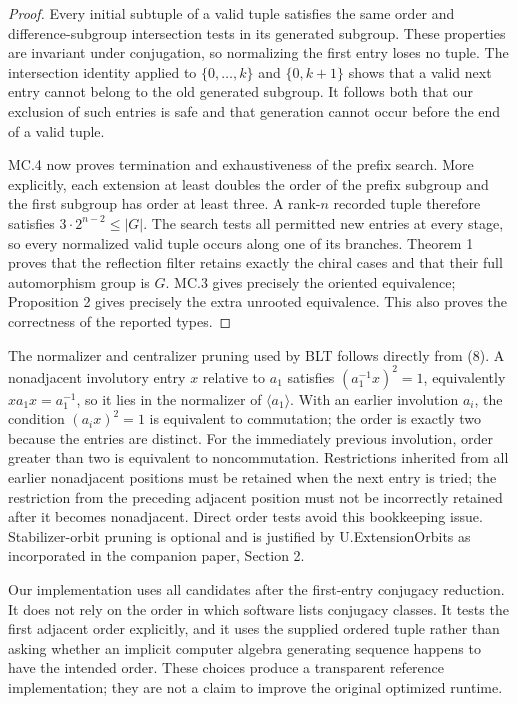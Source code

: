 \documentclass[11pt]{article}
\theoremstyle{remark}\newtheorem{remark}[theorem]{Remark}
\begin{document}
\begin{proof}
Every initial subtuple of a valid tuple satisfies the same order and difference-subgroup intersection tests in its generated subgroup. These properties are invariant under conjugation, so normalizing the first entry loses no tuple. The intersection identity applied to $\{0,\ldots,k\}$ and $\{0,k+1\}$ shows that a valid next entry cannot belong to the old generated subgroup. It follows both that our exclusion of such entries is safe and that generation cannot occur before the end of a valid tuple.

MC.4 now proves termination and exhaustiveness of the prefix search. More explicitly, each extension at least doubles the order of the prefix subgroup and the first subgroup has order at least three. A rank-$n$ recorded tuple therefore satisfies $3\cdot2^{n-2}\leq |G|$. The search tests all permitted new entries at every stage, so every normalized valid tuple occurs along one of its branches. Theorem 1 proves that the reflection filter retains exactly the chiral cases and that their full automorphism group is $G$. MC.3 gives precisely the oriented equivalence; Proposition 2 gives precisely the extra unrooted equivalence. This also proves the correctness of the reported types.
\end{proof}

The normalizer and centralizer pruning used by BLT follows directly from (8). A nonadjacent involutory entry $x$ relative to $a_1$ satisfies
$(a_1^{-1}x)^2=1$, equivalently $xa_1x=a_1^{-1}$, so it lies in the normalizer of $\langle a_1\rangle$. With an earlier involution $a_i$, the condition $(a_ix)^2=1$ is equivalent to commutation; the order is exactly two because the entries are distinct. For the immediately previous involution, order greater than two is equivalent to noncommutation. Restrictions inherited from all earlier nonadjacent positions must be retained when the next entry is tried; the restriction from the preceding adjacent position must not be incorrectly retained after it becomes nonadjacent. Direct order tests avoid this bookkeeping issue. Stabilizer-orbit pruning is optional and is justified by U.ExtensionOrbits as incorporated in the companion paper, Section 2.

Our implementation uses all candidates after the first-entry conjugacy reduction. It does not rely on the order in which software lists conjugacy classes. It tests the first adjacent order explicitly, and it uses the supplied ordered tuple rather than asking whether an implicit computer algebra generating sequence happens to have the intended order. These choices produce a transparent reference implementation; they are not a claim to improve the original optimized runtime.
\end{document}
